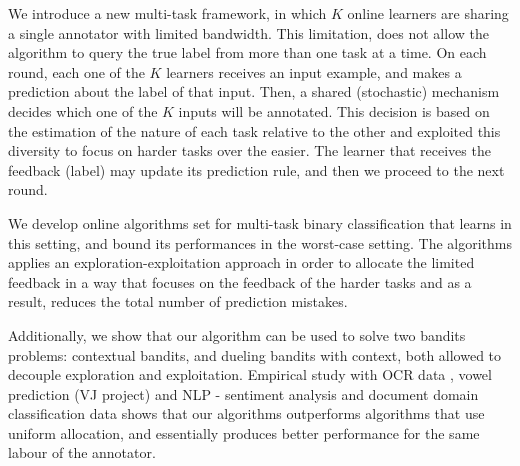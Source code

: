 \documentclass[MSc,afterExam]{iitcsthesis}
\begin{document}






\maketitleEnglish

\abstractEnglish
We introduce a new multi-task framework, in which $K$ online
learners are sharing a single annotator with limited bandwidth. This limitation, does not allow the algorithm to 
query the true label from more than one task at a time. On
each round, each one of the $K$ learners receives an input example, and makes a
prediction about the label of that input. Then, a shared
(stochastic) mechanism decides which one of the $K$ inputs will be
annotated. This decision is based on the estimation of the nature of each task relative to the other and 
exploited this diversity to focus on harder tasks over the easier. The learner that receives the feedback (label) may update
its prediction rule, and then we proceed to the next round. 

We develop 
online algorithms set for multi-task binary classification that learns in
this setting, and bound its performances in the worst-case
setting. The algorithms applies an exploration-exploitation approach in order to allocate the limited 
feedback in a way that focuses on the feedback of the harder tasks and as a result, reduces the total 
number of prediction mistakes.  

Additionally, we show that our algorithm can be used to
solve two bandits problems: contextual bandits, and dueling bandits
with context, both allowed to decouple exploration and
exploitation. Empirical study with OCR data , vowel prediction (VJ
project) and NLP - sentiment analysis and document domain classification data shows that our algorithms outperforms algorithms that use
uniform allocation, and essentially produces better performance for the
same labour of the annotator.
\end{document}
